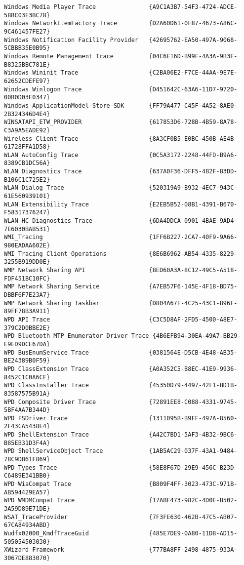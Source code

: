 \documentclass{report}
\begin{document}
\begin{lstlisting}[breaklines=true,basicstyle=\tiny]
Windows Media Player Trace               {A9C1A3B7-54F3-4724-ADCE-58BC03E3BC78}
Windows NetworkItemFactory Trace         {D2A60D61-0F87-4673-A86C-9C461457FE27}
Windows Notification Facility Provider   {42695762-EA50-497A-9068-5CBBB35E0B95}
Windows Remote Management Trace          {04C6E16D-B99F-4A3A-9B3E-B8325BBC781E}
Windows Wininit Trace                    {C2BA06E2-F7CE-44AA-9E7E-62652CDEFE97}
Windows Winlogon Trace                   {D451642C-63A6-11D7-9720-00B0D03E0347}
Windows-ApplicationModel-Store-SDK       {FF79A477-C45F-4A52-8AE0-2B324346D4E4}
WINSATAPI_ETW_PROVIDER                   {617853D6-728B-4B59-8A78-C3A9A5EADE92}
Wireless Client Trace                    {8A3CF0B5-E0BC-450B-AE4B-61728FFA1D58}
WLAN AutoConfig Trace                    {0C5A3172-2248-44FD-B9A6-8389CB1DC56A}
WLAN Diagnostics Trace                   {637A0F36-DFF5-4B2F-83DD-B106C1C725E2}
WLAN Dialog Trace                        {520319A9-B932-4EC7-943C-61E560939101}
WLAN Extensibility Trace                 {E2EB5B52-08B1-4391-B670-F58317376247}
WLAN HC Diagnostics Trace                {6DA4DDCA-0901-4BAE-9AD4-7E6030BAB531}
WMI_Tracing                              {1FF6B227-2CA7-40F9-9A66-980EADAA602E}
WMI_Tracing_Client_Operations            {8E6B6962-AB54-4335-8229-3255B919DD0E}
WMP Network Sharing API                  {8ED60A3A-8C12-49C5-A518-FDF451BC10FC}
WMP Network Sharing Service              {A7EB57F6-145E-4F18-BD75-DBBF6F7E23A7}
WMP Network Sharing Taskbar              {D804A67F-4C25-43C1-896F-89FF78B3A911}
WPD API Trace                            {C3C5D8AF-2FD5-4500-A8E7-379C2D0BBE2E}
WPD Bluetooth MTP Emumerator Driver Trace {4B6EFB94-30EA-49A7-BB29-E9ED9DCE67DA}
WPD BusEnumService Trace                 {0381564E-D5CB-4E48-AB35-BE24389B0F59}
WPD ClassExtension Trace                 {A0A352C5-B8EC-41E9-9936-8452C1C0A6CF}
WPD ClassInstaller Trace                 {45350D79-4497-42F1-BD1B-83587575B91A}
WPD Composite Driver Trace               {72891EE8-C088-4331-9745-5BF4AA7B344D}
WPD FSDriver Trace                       {1311095B-B9FF-497A-8560-2F43CA5438E4}
WPD ShellExtension Trace                 {A42C7BD1-5AF3-4B32-9BC6-B85EB31D3F4A}
WPD ShellServiceObject Trace             {1AB5AC29-037F-43A1-9484-78C9DB61F869}
WPD Types Trace                          {58E8F67D-29E9-456C-B23D-C6489E341BB0}
WPD WiaCompat Trace                      {B809F4FF-3023-473C-971B-AB594429EA57}
WPD WMDMCompat Trace                     {17ABF473-982C-4D0E-B502-3A59D89E71DE}
WSAT_TraceProvider                       {7F3FE630-462B-47C5-AB07-67CA84934ABD}
Wudfx02000_KmdfTraceGuid                 {485E7DE9-0A80-11D8-AD15-505054503030}
XWizard Framework                        {777BA8FF-2498-4875-933A-3067DE883070}
\end{lstlisting}
\end{document}
